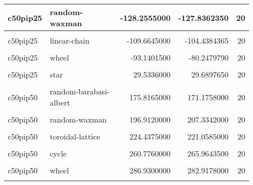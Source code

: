 \documentclass[
]{book}
\begin{document}
\begin{table}
\begin{tabular}{l|l|r|r|r}
\hline
c50pip25 & random-waxman & -128.2555000 & -127.8362350 & 20\\
\hline
\cellcolor{gray!6}{c50pip25} & \cellcolor{gray!6}{random-barabasi-albert} & \cellcolor{gray!6}{-119.6675000} & \cellcolor{gray!6}{-124.3501100} & \cellcolor{gray!6}{20}\\
\hline
c50pip25 & linear-chain & -109.6645000 & -104.4384365 & 20\\
\hline
\cellcolor{gray!6}{c50pip25} & \cellcolor{gray!6}{cycle} & \cellcolor{gray!6}{-96.3967500} & \cellcolor{gray!6}{-96.4360300} & \cellcolor{gray!6}{20}\\
\hline
c50pip25 & wheel & -93.1401500 & -80.2479790 & 20\\
\hline
\cellcolor{gray!6}{c50pip25} & \cellcolor{gray!6}{comet-kite} & \cellcolor{gray!6}{-35.9154000} & \cellcolor{gray!6}{-38.5166250} & \cellcolor{gray!6}{20}\\
\hline
c50pip25 & star & 29.5336000 & 29.6897650 & 20\\
\hline
\cellcolor{gray!6}{c50pip50} & \cellcolor{gray!6}{well-mixed} & \cellcolor{gray!6}{124.5965000} & \cellcolor{gray!6}{126.7944950} & \cellcolor{gray!6}{20}\\
\hline
c50pip50 & random-barabasi-albert & 175.8165000 & 171.1758000 & 20\\
\hline
\cellcolor{gray!6}{c50pip50} & \cellcolor{gray!6}{windmill} & \cellcolor{gray!6}{195.5930000} & \cellcolor{gray!6}{192.2814000} & \cellcolor{gray!6}{20}\\
\hline
c50pip50 & random-waxman & 196.9120000 & 207.3342000 & 20\\
\hline
\cellcolor{gray!6}{c50pip50} & \cellcolor{gray!6}{star} & \cellcolor{gray!6}{200.4315000} & \cellcolor{gray!6}{179.9736390} & \cellcolor{gray!6}{20}\\
\hline
c50pip50 & toroidal-lattice & 224.4375000 & 221.0585000 & 20\\
\hline
\cellcolor{gray!6}{c50pip50} & \cellcolor{gray!6}{linear-chain} & \cellcolor{gray!6}{254.4380000} & \cellcolor{gray!6}{257.4893000} & \cellcolor{gray!6}{20}\\
\hline
c50pip50 & cycle & 260.7760000 & 265.9643500 & 20\\
\hline
\cellcolor{gray!6}{c50pip50} & \cellcolor{gray!6}{comet-kite} & \cellcolor{gray!6}{280.7530000} & \cellcolor{gray!6}{272.8958000} & \cellcolor{gray!6}{20}\\
\hline
c50pip50 & wheel & 286.9300000 & 282.9178000 & 20\\
\hline
\cellcolor{gray!6}{c50pip75} & \cellcolor{gray!6}{well-mixed} & \cellcolor{gray!6}{256.7610000} & \cellcolor{gray!6}{254.8647500} & \cellcolor{gray!6}{20}\\

\end{tabular}
\end{table}
\end{document}
